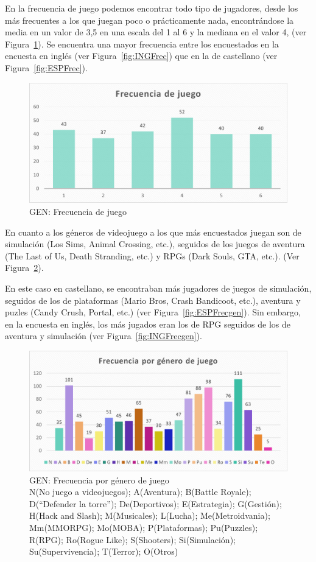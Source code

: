 \documentclass[12pt, a4paper,twoside,titlepage]{book}
\begin{document}
En la frecuencia de juego podemos encontrar todo tipo de jugadores, desde los más frecuentes a los que juegan poco o prácticamente nada, encontrándose la media en un valor de 3,5 en una escala del 1 al 6 y la mediana en el valor 4, (ver Figura~\ref{fig:Frec}). Se encuentra una mayor frecuencia entre los encuestados en la encuesta en inglés (ver Figura~\ref{fig:INGFrec}) que en la de castellano (ver Figura~\ref{fig:ESPFrec}).

\begin{figure}
\centering
 \includegraphics[width=.7\linewidth]{Imagenes Form GEN/3GENFrec}
 \caption{GEN: Frecuencia de juego}
 \label{fig:Frec}
 \end{figure}
 
En cuanto a los géneros de videojuego a los que más encuestados juegan son de simulación (Los Sims, Animal Crossing, etc.), seguidos de los juegos de aventura (The Last of Us, Death Stranding, etc.)  y RPGs (Dark Souls, GTA, etc.). (Ver Figura~\ref{fig:Frecgen}). 

En este caso en castellano, se encontraban más jugadores de juegos de simulación, seguidos de los de plataformas (Mario Bros, Crash Bandicoot, etc.), aventura y puzles (Candy Crush, Portal, etc.) (ver Figura~\ref{fig:ESPFrecgen}). Sin embargo, en la encuesta en inglés, los más jugados eran los de RPG seguidos de los de aventura y simulación (ver Figura~\ref{fig:INGFrecgen}).  


\begin{figure}
\centering
 \includegraphics[width=.8\linewidth]{Imagenes Form GEN/4GENGen}
 \caption{GEN: Frecuencia por género de juego \\
 \small{N(No juego a videojuegos); A(Aventura); B(Battle Royale); D(“Defender la torre”); De(Deportivos); E(Estrategia); G(Gestión); H(Hack and Slash); M(Musicales); L(Lucha); Me(Metroidvania); Mm(MMORPG); Mo(MOBA); P(Plataformas); Pu(Puzzles); R(RPG); Ro(Rogue Like); S(Shooters); Si(Simulación); Su(Supervivencia); T(Terror); O(Otros)}}
 \label{fig:Frecgen}
 \end{figure}
 
\end{document}
